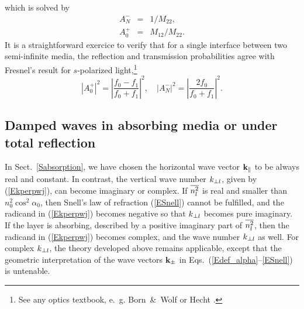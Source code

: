 which is solved by
\begin{equation}
  \begin{array}{lcl}
    A^-_N &=& 1/M_{22},\\[.2ex]
    A^+_0 &=& M_{12}/M_{22}.
  \end{array}
\end{equation}
It is a straightforward exercice to verify
that for a single interface between two semi-infinite media,
the reflection and transmission probabilities
agree with Fresnel's result for $s$-polarized light,\footnote
{See any optics textbook, e.~g. Born~\&~Wolf \cite[ch.~1.5.2]{BoWo99}
  or Hecht \cite[ch.~4.6.2]{Hec02}.}
\begin{equation}
  \left| A^+_0\right|^2
  = \left|\frac{f_0-f_1}{f_0+f_1}\right|^2,
  \quad
  \left| A^-_N\right|^2
  = \left| \frac{2f_0}{f_0+f_1}\right|^2.
\end{equation}


\subsection{Damped waves in absorbing media
  or under total reflection}\label{s:complex}

In Sect.~\ref{Sabsorption},
we have chosen the horizontal wave vector $\mathbf{k}_{\parallel}$
to be always real and constant.
In contrast, the vertical wave number $k_{\perp l}$,
given by (\ref{Ekperpwj}),
can become imaginary or complex.
If $\overline{n_l^2}$ is real and smaller than~$n_0^2\cos^2\alpha_0$,
then Snell's law of refraction (\ref{ESnell}) cannot be fulfilled,
and the radicand in (\ref{Ekperpwj}) becomes negative
so that $k_{\perp l}$ becomes pure imaginary.
%
If the layer is absorbing,
described by a positive imaginary part of $\overline{n_l^2}$,
then the radicand in (\ref{Ekperpwj}) becomes complex,
and the wave number $k_{\perp l}$ as well.
For complex $k_{\perp l}$,
the theory developed above remains applicable,
except that the geometric interpretation of the wave vectors $\mathbf{k}_\pm$
in Eqs.~(\ref{Edef_alpha}--\ref{ESnell}) is untenable.

